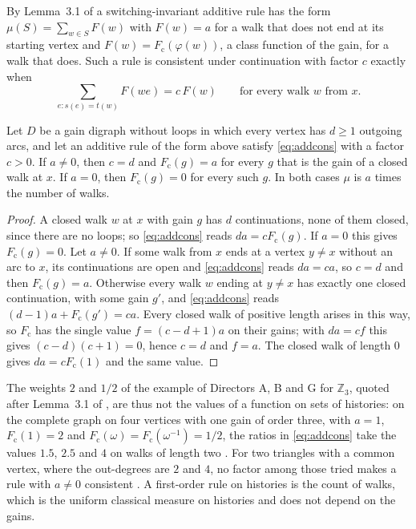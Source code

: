 By Lemma~3.1 of \cite{g8} a switching-invariant additive rule has the form $\mu(S)=\sum_{w\in S}F(w)$ with $F(w)=a$ for a walk that does not end at its starting vertex and $F(w)=F_{\mathrm c}(\varphi(w))$, a class function of the gain, for a walk that does. Such a rule is consistent under continuation with factor $c$ exactly when
\begin{equation}\label{eq:addcons}
\sum_{e\colon s(e)=t(w)}F(we)=c\,F(w)\qquad\text{for every walk }w\text{ from }x .
\end{equation}

\begin{proposition}\label{prop:add}
Let $D$ be a gain digraph without loops in which every vertex has $d\ge1$ outgoing arcs, and let an additive rule of the form above satisfy \eqref{eq:addcons} with a factor $c>0$. If $a\ne0$, then $c=d$ and $F_{\mathrm c}(g)=a$ for every $g$ that is the gain of a closed walk at $x$. If $a=0$, then $F_{\mathrm c}(g)=0$ for every such $g$. In both cases $\mu$ is $a$ times the number of walks.
\end{proposition}
\begin{proof}
A closed walk $w$ at $x$ with gain $g$ has $d$ continuations, none of them closed, since there are no loops; so \eqref{eq:addcons} reads $da=cF_{\mathrm c}(g)$. If $a=0$ this gives $F_{\mathrm c}(g)=0$. Let $a\ne0$. If some walk from $x$ ends at a vertex $y\ne x$ without an arc to $x$, its continuations are open and \eqref{eq:addcons} reads $da=ca$, so $c=d$ and then $F_{\mathrm c}(g)=a$. Otherwise every walk $w$ ending at $y\ne x$ has exactly one closed continuation, with some gain $g'$, and \eqref{eq:addcons} reads $(d-1)a+F_{\mathrm c}(g')=ca$. Every closed walk of positive length arises in this way, so $F_{\mathrm c}$ has the single value $f=(c-d+1)a$ on their gains; with $da=cf$ this gives $(c-d)(c+1)=0$, hence $c=d$ and $f=a$. The closed walk of length $0$ gives $da=cF_{\mathrm c}(1)$ and the same value.
\end{proof}

The weights $2$ and $1/2$ of the example of Directors A, B and G for $\mathbb{Z}_3$, quoted after Lemma~3.1 of \cite{g8}, are thus not the values of a function on sets of histories: on the complete graph on four vertices with one gain of order three, with $a=1$, $F_{\mathrm c}(1)=2$ and $F_{\mathrm c}(\omega)=F_{\mathrm c}(\omega^{-1})=1/2$, the ratios in \eqref{eq:addcons} take the values $1.5$, $2.5$ and $4$ on walks of length two \cite{comp4s}. For two triangles with a common vertex, where the out-degrees are $2$ and $4$, no factor among those tried makes a rule with $a\ne0$ consistent \cite{comp4s}. A first-order rule on histories is the count of walks, which is the uniform classical measure on histories and does not depend on the gains.

